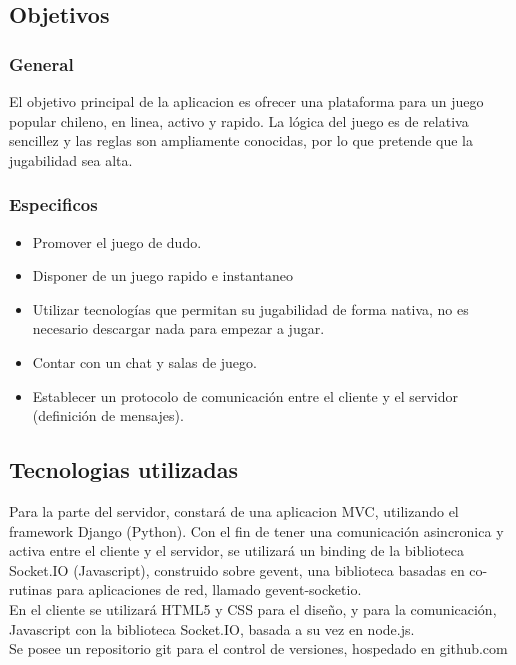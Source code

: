 \subsection{Objetivos}
\subsubsection{General}
El objetivo principal de la aplicacion es ofrecer una plataforma para
un juego popular chileno, en linea, activo y rapido. La lógica del juego
es de relativa sencillez y las reglas son ampliamente conocidas, por lo que
pretende que la jugabilidad sea alta.

\subsubsection{Especificos}
\begin{itemize}
	\item Promover el juego de dudo.
	\item Disponer de un juego rapido e instantaneo
	\item Utilizar tecnologías que permitan su jugabilidad de forma nativa,
	no es necesario descargar nada para empezar a jugar.
	\item Contar con un chat y salas de juego.
	\item Establecer un protocolo de comunicación entre el cliente y el servidor (definición de mensajes).
\end{itemize}

\subsection{Tecnologias utilizadas}
Para la parte del servidor, constará de una aplicacion MVC, utilizando el framework
Django (Python). Con el fin de tener una comunicación asincronica y activa entre
el cliente y el servidor, se utilizará un binding de la biblioteca Socket.IO (Javascript),
construido sobre gevent, una biblioteca basadas en co-rutinas para aplicaciones de red, llamado
gevent-socketio.\\

En el cliente se utilizará HTML5 y CSS para el diseño, y para la comunicación, Javascript
con la biblioteca Socket.IO, basada a su vez en node.js.\\

Se posee un repositorio git para el control de versiones, hospedado en github.com



